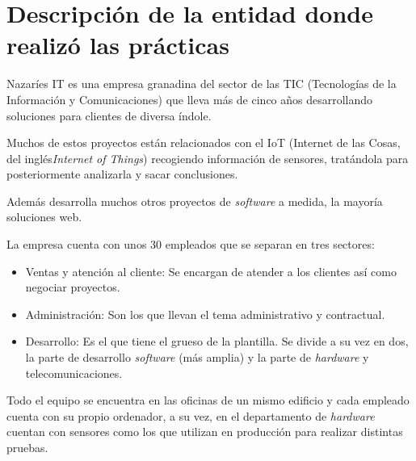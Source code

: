 \chapter{Descripción de la entidad donde realizó las prácticas}

Nazaríes IT es una empresa granadina del sector de las TIC (Tecnologías de la Información y Comunicaciones) que lleva más de cinco años desarrollando soluciones para clientes de diversa índole.

Muchos de estos proyectos están relacionados con el IoT (Internet de las Cosas, del inglés\textit{Internet of Things}) recogiendo información de sensores, tratándola para posteriormente analizarla y sacar conclusiones. 

Además desarrolla muchos otros proyectos de \textit{software} a medida, la mayoría soluciones web.

La empresa cuenta con unos 30 empleados que se separan en tres sectores:

\begin{itemize}
	\item Ventas y atención al cliente: Se encargan de atender a los clientes así como negociar proyectos.
	\item Administración: Son los que llevan el tema administrativo y contractual.
	\item Desarrollo: Es el que tiene el grueso de la plantilla. Se divide a su vez en dos, la parte de desarrollo \textit{software} (más amplia) y la parte de \textit{hardware} y telecomunicaciones.
\end{itemize}

Todo el equipo se encuentra en las oficinas de un mismo edificio y cada empleado cuenta con su propio ordenador, a su vez, en el departamento de \textit{hardware} cuentan con sensores como los que utilizan en producción para realizar distintas pruebas.
